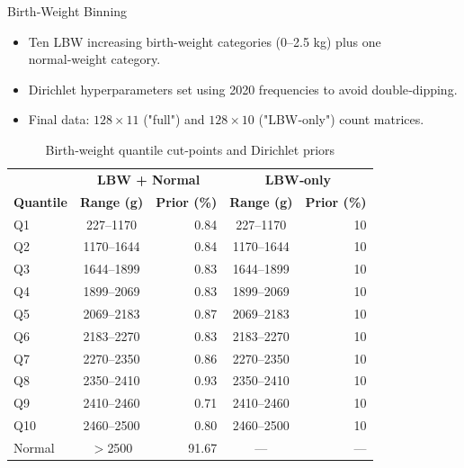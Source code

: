 \documentclass[aspectratio=169,professionalfonts]{beamer}
\begin{document}
\begin{frame}{Birth‑Weight Binning}
\begin{itemize}
  \item Ten LBW increasing birth-weight categories (0–2.5 kg) plus one normal‑weight category.
  \item Dirichlet hyperparameters set using 2020 frequencies to avoid double‑dipping.
  \item Final data: $128\times11$ ("full") and $128\times10$ ("LBW‑only") count matrices.
\end{itemize}

\begin{table}[htbp]
\centering
\scriptsize
\setlength{\tabcolsep}{3pt}
\renewcommand{\arraystretch}{0.85}
\caption{Birth‑weight quantile cut‑points and Dirichlet priors}
\begin{tabular}{@{}l c r c r@{}}
\toprule
& \multicolumn{2}{c}{\textbf{LBW + Normal}} &
  \multicolumn{2}{c}{\textbf{LBW‑only}} \\
\cmidrule(lr){2-3}\cmidrule(lr){4-5}
\textbf{Quantile} & \textbf{Range (g)} & \textbf{Prior (\%)} &
                     \textbf{Range (g)} & \textbf{Prior (\%)} \\
\midrule
Q1  & 227–1170  & 0.84 & 227–1170  & 10 \\
Q2  & 1170–1644 & 0.84 & 1170–1644 & 10 \\
Q3  & 1644–1899 & 0.83 & 1644–1899 & 10 \\
Q4  & 1899–2069 & 0.83 & 1899–2069 & 10 \\
Q5  & 2069–2183 & 0.87 & 2069–2183 & 10 \\
Q6  & 2183–2270 & 0.83 & 2183–2270 & 10 \\
Q7  & 2270–2350 & 0.86 & 2270–2350 & 10 \\
Q8  & 2350–2410 & 0.93 & 2350–2410 & 10 \\
Q9  & 2410–2460 & 0.71 & 2410–2460 & 10 \\
Q10 & 2460–2500 & 0.80 & 2460–2500 & 10 \\
Normal & $>$2500 & 91.67 & — & — \\
\bottomrule
\end{tabular}
\end{table}
\end{frame}
\end{document}
